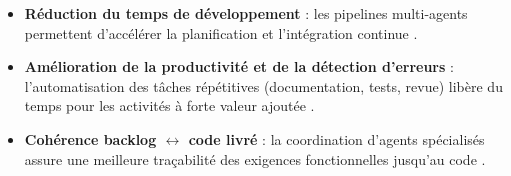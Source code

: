 \begin{itemize}
  \item \textbf{Réduction du temps de développement} : les pipelines multi-agents permettent d’accélérer la planification et l’intégration continue \parencite{khan_ai-driven_2025}.
  \item \textbf{Amélioration de la productivité et de la détection d’erreurs} : l’automatisation des tâches répétitives (documentation, tests, revue) libère du temps pour les activités à forte valeur ajoutée \parencite{abbas_ai-driven_2024}.
  \item \textbf{Cohérence backlog $\leftrightarrow$ code livré} : la coordination d’agents spécialisés assure une meilleure traçabilité des exigences fonctionnelles jusqu’au code \parencite{khan_ai-driven_2025}.
\end{itemize}
